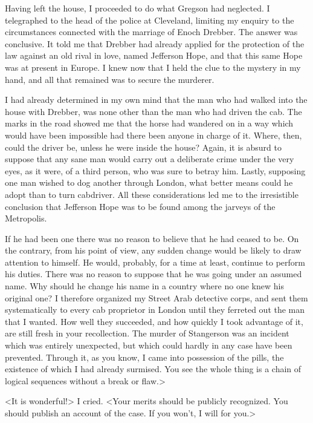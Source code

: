 Having left the house, I proceeded to do what Gregson had neglected. I telegraphed to the head of the police at Cleveland, limiting my enquiry to the circumstances connected with the marriage of Enoch Drebber. The answer was conclusive. It told me that Drebber had already applied for the protection of the law against an old rival in love, named Jefferson Hope, and that this same Hope was at present in Europe. I knew now that I held the clue to the mystery in my hand, and all that remained was to secure the murderer.

I had already determined in my own mind that the man who had walked into the house with Drebber, was none other than the man who had driven the cab. The marks in the road showed me that the horse had wandered on in a way which would have been impossible had there been anyone in charge of it. Where, then, could the driver be, unless he were inside the house? Again, it is absurd to suppose that any sane man would carry out a deliberate crime under the very eyes, as it were, of a third person, who was sure to betray him. Lastly, supposing one man wished to dog another through London, what better means could he adopt than to turn cabdriver. All these considerations led me to the irresistible conclusion that Jefferson Hope was to be found among the jarveys of the Metropolis.

If he had been one there was no reason to believe that he had ceased to be. On the contrary, from his point of view, any sudden change would be likely to draw attention to himself. He would, probably, for a time at least, continue to perform his duties. There was no reason to suppose that he was going under an assumed name. Why should he change his name in a country where no one knew his original one? I therefore organized my Street Arab detective corps, and sent them systematically to every cab proprietor in London until they ferreted out the man that I wanted. How well they succeeded, and how quickly I took advantage of it, are still fresh in your recollection. The murder of Stangerson was an incident which was entirely unexpected, but which could hardly in any case have been prevented. Through it, as you know, I came into possession of the pills, the existence of which I had already surmised. You see the whole thing is a chain of logical sequences without a break or flaw.>

<It is wonderful!> I cried. <Your merits should be publicly recognized. You should publish an account of the case. If you won't, I will for you.>

